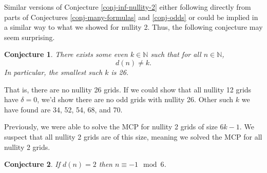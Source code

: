\documentclass[a4paper]{article}
\newtheorem{conjecture}{Conjecture}
\newcommand{\N}{\mathbb{N}}
\begin{document}
	Similar versions of Conjecture \ref{conj-inf-nullity-2} either following directly from parts of Conjectures \ref{conj-many-formulas} and \ref{conj-odds} or could be implied in a similar way to what we showed for nullity 2.
	Thus, the following conjecture may seem surprising.
	\begin{conjecture}
		There exists some even $k \in \N$ such that for all $n \in \N$,
		\begin{equation*}
			d(n) \neq k.
		\end{equation*}
		In particular, the smallest such $k$ is 26.
	\end{conjecture}
	That is, there are no nullity 26 grids.
	If we could show that all nullity 12 grids have $\delta = 0$, we'd show there are no odd grids with nullity 26.
	Other such $k$ we have found are 34, 52, 54, 68, and 70.
	
	Previously, we were able to solve the MCP for nullity 2 grids of size $6k-1$.
	We suspect that all nullity 2 grids are of this size, meaning we solved the MCP for all nullity 2 grids.
	\begin{conjecture}
		If $d(n) = 2$ then $n \equiv -1 \mod 6$.
	\end{conjecture}
\end{document}
